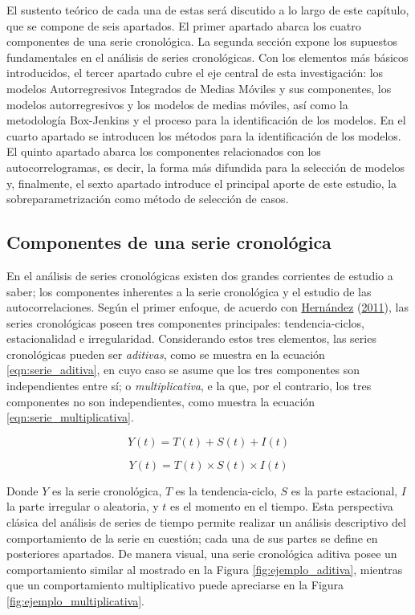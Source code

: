 \documentclass[
]{article}
\begin{document}
El sustento teórico de cada una de estas será discutido a lo largo de
este capítulo, que se compone de seis apartados. El primer apartado
abarca los cuatro componentes de una serie cronológica. La segunda
sección expone los supuestos fundamentales en el análisis de series
cronológicas. Con los elementos más básicos introducidos, el tercer
apartado cubre el eje central de esta investigación: los modelos
Autorregresivos Integrados de Medias Móviles y sus componentes, los
modelos autorregresivos y los modelos de medias móviles, así como la
metodología Box-Jenkins y el proceso para la identificación de los
modelos. En el cuarto apartado se introducen los métodos para la
identificación de los modelos. El quinto apartado abarca los componentes
relacionados con los autocorrelogramas, es decir, la forma más difundida
para la selección de modelos y, finalmente, el sexto apartado introduce
el principal aporte de este estudio, la sobreparametrización como método
de selección de casos.

\subsection{Componentes de una serie cronológica}

En el análisis de series cronológicas existen dos grandes corrientes de
estudio a saber; los componentes inherentes a la serie cronológica y el
estudio de las autocorrelaciones. Según el primer enfoque, de acuerdo
con \protect\hyperlink{ref-oscarh-1}{Hernández}
(\protect\hyperlink{ref-oscarh-1}{2011}), las series cronológicas poseen
tres componentes principales: tendencia-ciclos, estacionalidad e
irregularidad. Considerando estos tres elementos, las series
cronológicas pueden ser \emph{aditivas}, como se muestra en la ecuación
\eqref{eqn:serie_aditiva}, en cuyo caso se asume que los tres
componentes son independientes entre sí; o \emph{multiplicativa}, e la
que, por el contrario, los tres componentes no son independientes, como
muestra la ecuación \eqref{eqn:serie_multiplicativa}.

\newpage

\begin{equation}
\label{eqn:serie_aditiva}
Y(t)=T(t)+S(t)+I(t)
\end{equation}

\begin{equation}
\label{eqn:serie_multiplicativa}
Y(t)=T(t)\times S(t)\times I(t)
\end{equation}

Donde \(Y\) es la serie cronológica, \(T\) es la tendencia-ciclo, \(S\)
es la parte estacional, \(I\) la parte irregular o aleatoria, y \(t\) es
el momento en el tiempo. Esta perspectiva clásica del análisis de series
de tiempo permite realizar un análisis descriptivo del comportamiento de
la serie en cuestión; cada una de sus partes se define en posteriores
apartados. De manera visual, una serie cronológica aditiva posee un
comportamiento similar al mostrado en la Figura
\ref{fig:ejemplo_aditiva}, mientras que un comportamiento multiplicativo
puede apreciarse en la Figura \ref{fig:ejemplo_multiplicativa}.
\end{document}
